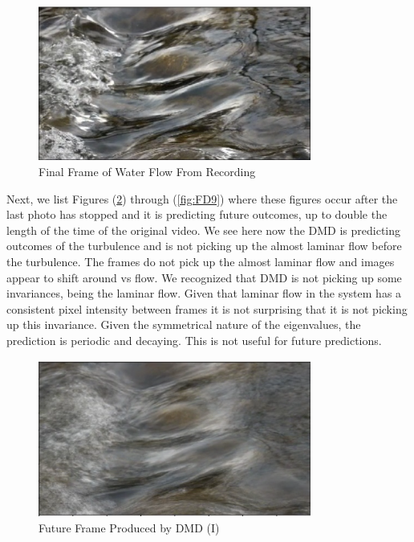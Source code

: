 \documentclass[12pt]{report}
\begin{document}
\begin{figure}[H]
    \centering
    \includegraphics[width=0.8\textwidth]{Fluid Dynamics/FD5.png}
    \caption{Final Frame of Water Flow From Recording} \label{fig:FD5}
\end{figure}
\noindent

Next, we list Figures (\ref{fig:FD6}) through (\ref{fig:FD9}) where these figures occur after the last photo has stopped and it is predicting future outcomes, up to double the length of the time of the original video. We see here now the DMD is predicting outcomes of the turbulence and is not picking up the almost laminar flow before the turbulence. The frames do not pick up the almost laminar flow and images appear to shift around vs flow. We recognized that DMD is not picking up some invariances, being the laminar flow. Given that laminar flow in the system has a consistent pixel intensity between frames it is not surprising that it is not picking up this invariance. Given the symmetrical nature of the eigenvalues, the prediction is periodic and decaying. This is not useful for future predictions.

\begin{figure}[H]
    \centering
    \includegraphics[width=0.8\textwidth]{Fluid Dynamics/FD6.png}
    \caption{Future Frame Produced by DMD (I)} \label{fig:FD6}
\end{figure}
\noindent
\end{document}
